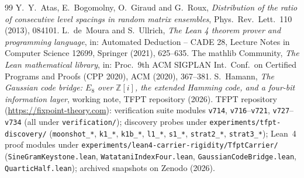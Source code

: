 \documentclass[11pt,a4paper]{article}
\theoremstyle{remark}
\newcommand{\Z}{\mathbb Z}
\begin{document}
\begin{thebibliography}{99}
 Y.~Y.~Atas, E.~Bogomolny, O.~Giraud and G.~Roux,
\emph{Distribution of the ratio of consecutive level spacings in
random matrix ensembles}, Phys.\ Rev.\ Lett.\ 110 (2013), 084101.
 L.~de~Moura and S.~Ullrich,
\emph{The Lean 4 theorem prover and programming language},
in: Automated Deduction -- CADE 28, Lecture Notes in Computer
Science 12699, Springer (2021), 625--635.
 The mathlib Community,
\emph{The Lean mathematical library},
in: Proc.\ 9th ACM SIGPLAN Int.\ Conf.\ on Certified Programs and
Proofs (CPP 2020), ACM (2020), 367--381.
 S.~Hamann,
\emph{The Gaussian code bridge: $E_8$ over $\Z[i]$, the extended
Hamming code, and a four-bit information layer}, working note,
TFPT repository (2026).
 TFPT repository
(\url{https://fixpoint-theory.com}): verification suite modules
\texttt{v714}, \texttt{v716}--\texttt{v721},
\texttt{v727}--\texttt{v734} (all under \texttt{verification/});
discovery probes under \texttt{experiments/tfpt-discovery/}
(\texttt{moonshot\_*}, \texttt{k1\_*}, \texttt{k1b\_*},
\texttt{l1\_*}, \texttt{s1\_*}, \texttt{strat2\_*},
\texttt{strat3\_*}); Lean~4 proof modules under
\texttt{experiments/lean4-carrier-rigidity/TfptCarrier/}
(\texttt{SineGramKeystone.lean}, \texttt{WatataniIndexFour.lean},
\texttt{GaussianCodeBridge.lean}, \texttt{QuarticHalf.lean});
archived snapshots on Zenodo (2026).
\end{thebibliography}
\end{document}
